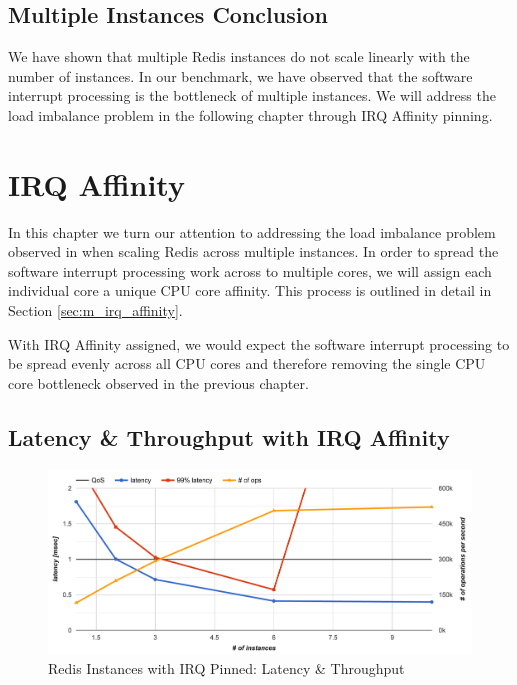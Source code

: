 \subsection{Multiple Instances Conclusion}
We have shown that multiple Redis instances do not scale linearly with the number of instances. In our benchmark, we have observed that the software interrupt processing is the bottleneck of multiple instances. We will address the load imbalance problem in the following chapter through IRQ Affinity pinning.

\section{IRQ Affinity}
In this chapter we turn our attention to addressing the load imbalance problem observed in when scaling Redis across multiple instances. In order to spread the software interrupt processing work across to multiple cores, we will assign each individual core a unique CPU core affinity. This process is outlined in detail in Section \ref{sec:m_irq_affinity}.

With IRQ Affinity assigned, we would expect the software interrupt processing to be spread evenly across all CPU cores and therefore removing the single CPU core bottleneck observed in the previous chapter.

\subsection{Latency \& Throughput with IRQ Affinity}
\begin{figure}[h]
    \includegraphics[width=\textwidth]{./res2/r_irq_latency.png}
    \caption{Redis Instances with IRQ Pinned: Latency \& Throughput}
    \label{fig:r_irq_latency}
\end{figure}

